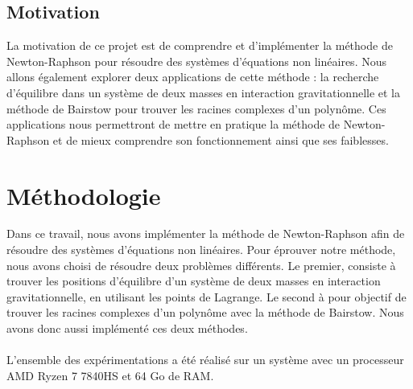 \documentclass{article}
\begin{document}
\subsection{Motivation}
La motivation de ce projet est de comprendre et d'implémenter la méthode de Newton-Raphson pour résoudre des systèmes d'équations non linéaires. Nous allons également explorer deux applications de cette méthode : la recherche d'équilibre dans un système de deux masses en interaction gravitationnelle et la méthode de Bairstow pour trouver les racines complexes d'un polynôme. Ces applications nous permettront de mettre en pratique la méthode de Newton-Raphson et de mieux comprendre son fonctionnement ainsi que ses faiblesses.

\section{Méthodologie}
Dans ce travail,  nous avons implémenter la méthode de Newton-Raphson afin de résoudre des systèmes d'équations non linéaires. Pour éprouver notre méthode, nous avons choisi de résoudre deux problèmes différents. Le premier, consiste à trouver les positions d'équilibre d'un système de deux masses en interaction gravitationnelle, en utilisant les points de Lagrange. Le second à pour objectif de trouver les racines complexes d'un polynôme avec la méthode de Bairstow. Nous avons donc aussi implémenté ces deux méthodes. \\ \\
L'ensemble des expérimentations a été réalisé sur un système avec un processeur AMD Ryzen 7 7840HS et 64 Go de RAM. %
\end{document}

